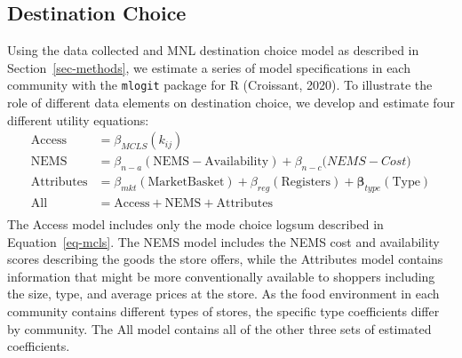 \documentclass[
  letterpaper,
  number,
  review,
  3p]{elsarticle}
\begin{document}
\subsection{Destination Choice}\label{sec-estimation}

Using the data collected and MNL destination choice model as described
in Section~\ref{sec-methods}, we estimate a series of model
specifications in each community with the \texttt{mlogit} package for R
(Croissant, 2020). To illustrate the role of different data elements on
destination choice, we develop and estimate four different utility
equations: \begin{align*}
\mathrm{Access} &= \beta_{MCLS}( k_{ij})\\
\mathrm{NEMS} &= \beta_{n-a} (\mathrm{NEMS-Availability}) + \beta_{n-c}\mathrm({NEMS-Cost})\\
\mathrm{Attributes} &= \beta_{mkt} (\mathrm{Market Basket}) + \beta_{reg} (\mathrm{Registers}) + \mathbf{\beta}_{type}(\mathrm{Type})\\
\mathrm{All} &= \mathrm{Access} + \mathrm{NEMS} + \mathrm{Attributes}\\
\end{align*} The Access model includes only the mode choice logsum
described in Equation~\ref{eq-mcls}. The NEMS model includes the NEMS
cost and availability scores describing the goods the store offers,
while the Attributes model contains information that might be more
conventionally available to shoppers including the size, type, and
average prices at the store. As the food environment in each community
contains different types of stores, the specific type coefficients
differ by community. The All model contains all of the other three sets
of estimated coefficients.
\end{document}
